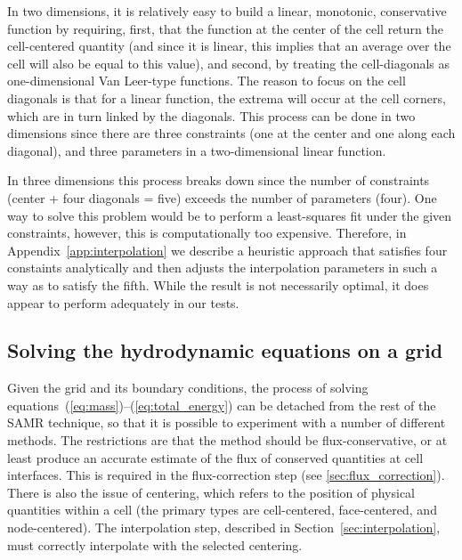 In two dimensions, it is relatively easy to build a linear, monotonic,
conservative function by requiring, first, that the function at the
center of the cell return the cell-centered quantity (and since it is
linear, this implies that an average over the cell will also be equal
to this value), and second, by treating the cell-diagonals as
one-dimensional Van Leer-type functions.  The reason to focus on the
cell diagonals is that for a linear function, the extrema will occur at the cell 
corners, which are in turn linked by the diagonals.  This process can be done in
two dimensions since there are three constraints (one at the center and one along
each diagonal), and three parameters in a two-dimensional linear
function.

In three dimensions this process breaks down since the number of
constraints (center + four diagonals = five) exceeds the number of
parameters (four).  One way to solve this problem would be to perform
a least-squares fit under the given constraints, however, this is
computationally too expensive.  Therefore, in Appendix~\ref{app:interpolation} we describe
a heuristic approach that satisfies four constaints analytically and
then adjusts the interpolation parameters in such a way as to satisfy the fifth.
While the result is not necessarily optimal, it does appear to perform
adequately in our tests.


\subsection{Solving the hydrodynamic equations on a grid}
\label{sec:solve_hydro}

Given the grid and its boundary conditions, the process of solving
equations~(\ref{eq:mass})--(\ref{eq:total_energy}) can be detached
from the rest of the SAMR technique, so that it is possible to
experiment with a number of different methods.  The restrictions are
that the method should be flux-conservative, or at least produce an
accurate estimate of the flux of conserved quantities at cell
interfaces.  This is required in the flux-correction step (see
\ref{sec:flux_correction}).  There is also the issue of centering,
which refers to the position of physical quantities within a cell (the
primary types are cell-centered, face-centered, and node-centered). 
The interpolation step, described in
Section~\ref{sec:interpolation}, must correctly interpolate with the
selected centering.

